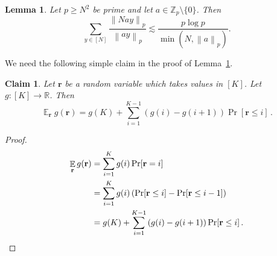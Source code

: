 \documentclass[11pt]{article}
\numberwithin{equation}{section}
\newtheorem{lemma}[theorem]{Lemma}
\newtheorem{claim}[theorem]{Claim}
\theoremstyle{definition}
\theoremstyle{plain}
\newcommand{\R}{\mathbb R}
\newcommand{\Z}{\mathbb Z}
\theoremstyle{definition}\newtheorem{problem}[theorem]{Problem}\theoremstyle{plain}
\DeclareMathOperator{\Ex}{{\mathbb E}}
\newcommand{\Br}{\mathbf{r}}   %
\newcommand{\norm}[1]{\left\| #1 \right\|_p}
\begin{document}
\begin{lemma}\label{lemma:EEstimate}
 Let $p\geq N^2$ be prime and let $a\in \Z_p\setminus \{0\}$. Then
 $$\sum_{y \in [N]} \frac{\norm{Nay}}{\norm{ay}} \lesssim \frac{p\log p}{\min(N,\norm{a})}.$$
\end{lemma}

We need the following simple claim in the proof of Lemma~\ref{lemma:EEstimate}.
\begin{claim}\label{claim:partialsummation}
Let $\Br$ be a random variable which takes values in $[K]$. Let $g:[K] \to \R$. Then
\[ \Ex_\Br g(\Br) = g(K) + \sum_{i=1}^{K-1} \left(g(i)-g(i+1)\right) \Pr[\Br \leq i]\,. \]
\end{claim}
\begin{proof}
%
%
%
%
%
%
  \begin{align*}
  \Ex_\Br g(\Br)
   &=  \sum_{i=1}^{K} g(i) \Pr[\Br = i]\\
   &= \sum_{i=1}^{K} g(i) \left(\Pr[\Br \leq i] - \Pr[\Br \leq {i-1}]\right)\\
   &= g(K) +  \sum_{i=1}^{K-1} \left(g(i)-g(i+1)\right) \Pr[\Br \leq i]\,.
 \qedhere    %
  \end{align*}
\end{proof}
\end{document}
